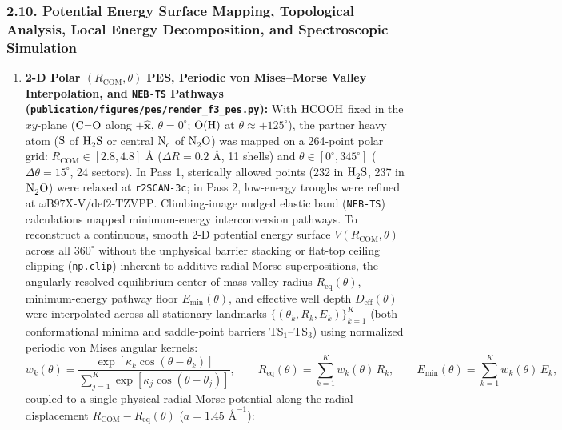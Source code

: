 \documentclass[journal=jpclcd,manuscript=article]{achemso}
\begin{document}
\subsubsection{2.10. Potential Energy Surface Mapping, Topological Analysis, Local Energy Decomposition, and Spectroscopic Simulation}
\begin{enumerate}
  \item \textbf{2-D Polar $(R_{\mathrm{COM}},\theta)$ PES, Periodic von Mises--Morse Valley Interpolation, and \texttt{NEB-TS} Pathways (\texttt{publication/figures/pes/render\_f3\_pes.py}):} With $\ce{HCOOH}$ fixed in the $xy$-plane ($\ce{C=O}$ along $+\hat{\mathbf{x}}$, $\theta = 0^\circ$; $\ce{O(H)}$ at $\theta \approx +125^\circ$), the partner heavy atom ($\ce{S}$ of $\ce{H2S}$ or central $\ce{N_c}$ of $\ce{N2O}$) was mapped on a 264-point polar grid: $R_{\mathrm{COM}} \in [2.8, 4.8]\text{ \AA}$ ($\Delta R = 0.2\text{ \AA}$, 11 shells) and $\theta \in [0^\circ, 345^\circ]$ ($\Delta\theta = 15^\circ$, 24 sectors). In Pass 1, sterically allowed points (232 in $\ce{H2S}$, 237 in $\ce{N2O}$) were relaxed at \texttt{r2SCAN-3c}; in Pass 2, low-energy troughs were refined at $\omega\text{B97X-V/def2-TZVPP}$. Climbing-image nudged elastic band (\texttt{NEB-TS}) calculations \cite{Asgeirsson2021} mapped minimum-energy interconversion pathways. To reconstruct a continuous, smooth 2-D potential energy surface $V(R_{\mathrm{COM}}, \theta)$ across all $360^\circ$ without the unphysical barrier stacking or flat-top ceiling clipping (\texttt{np.clip}) inherent to additive radial Morse superpositions, the angularly resolved equilibrium center-of-mass valley radius $R_{\mathrm{eq}}(\theta)$, minimum-energy pathway floor $E_{\mathrm{min}}(\theta)$, and effective well depth $D_{\mathrm{eff}}(\theta)$ were interpolated across all stationary landmarks $\{(\theta_k, R_k, E_k)\}_{k=1}^K$ (both conformational minima and saddle-point barriers $\mathrm{TS}_1\text{--}\mathrm{TS}_3$) using normalized periodic von Mises angular kernels:
  \begin{equation}
    w_k(\theta) = \frac{\exp\!\left[\kappa_k \cos(\theta - \theta_k)\right]}{\sum_{j=1}^K \exp\!\left[\kappa_j \cos(\theta - \theta_j)\right]}, \qquad R_{\mathrm{eq}}(\theta) = \sum_{k=1}^K w_k(\theta)\,R_k, \qquad E_{\mathrm{min}}(\theta) = \sum_{k=1}^K w_k(\theta)\,E_k,
  \end{equation}
  coupled to a single physical radial Morse potential along the radial displacement $R_{\mathrm{COM}} - R_{\mathrm{eq}}(\theta)$ ($a = 1.45\text{ \AA}^{-1}$):
  \begin{equation}

\end{equation}
\end{enumerate}
\end{document}

